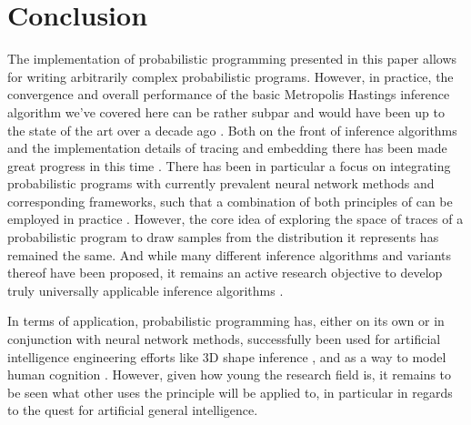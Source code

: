 \section{Conclusion}

The implementation of probabilistic programming presented in this paper allows for writing arbitrarily complex probabilistic programs. However, in practice, the convergence and overall performance of the basic Metropolis Hastings inference algorithm we've covered here can be rather subpar and would have been up to the state of the art over a decade ago \cite{wingate2011lightweight}. Both on the front of inference algorithms and the implementation details of tracing and embedding there has been made great progress in this time \cite{wood2014new} \cite{cusumano2019gen}. There has been in particular a focus on integrating probabilistic programs with currently prevalent neural network methods and corresponding frameworks, such that a combination of both principles of can be employed in practice \cite{bingham2019pyro} \cite{cusumano2019gen}. However, the core idea of exploring the space of traces of a probabilistic program to draw samples from the distribution it represents has remained the same. And while many different inference algorithms and variants thereof have been proposed, it remains an active research objective to develop truly universally applicable inference algorithms \cite{lew2023smcp3}.

In terms of application, probabilistic programming has, either on its own or in conjunction with neural network methods, successfully been used for artificial intelligence engineering efforts like 3D shape inference \cite{mansinghka2013approximate} \cite{hoffman2023probnerf}, and as a way to model human cognition \cite{griffiths2010probabilistic} \cite{stuhlmuller2015modeling}. However, given how young the research field is, it remains to be seen what other uses the principle will be applied to, in particular in regards to the quest for artificial general intelligence.